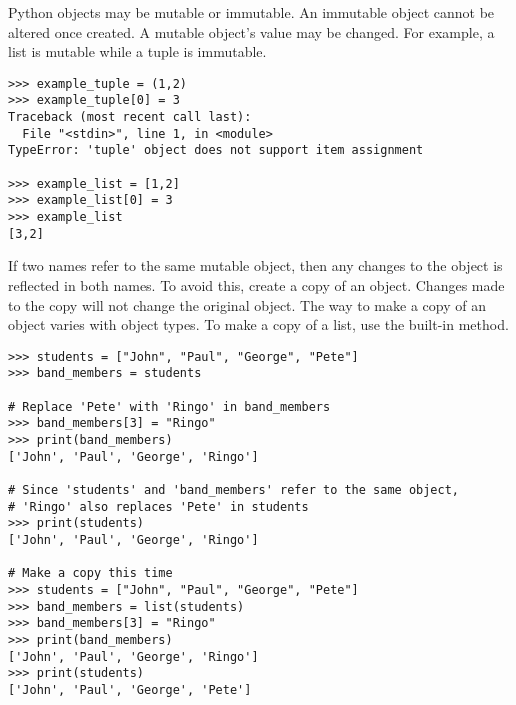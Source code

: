 Python objects may be mutable or immutable.
An immutable object cannot be altered once created.
A mutable object's value may be changed.
For example, a list is mutable while a tuple is immutable.
\begin{lstlisting}
>>> example_tuple = (1,2)
>>> example_tuple[0] = 3
Traceback (most recent call last):
  File "<stdin>", line 1, in <module>
TypeError: 'tuple' object does not support item assignment

>>> example_list = [1,2]
>>> example_list[0] = 3
>>> example_list
[3,2]
\end{lstlisting}

If two names refer to the same mutable object, then any changes to the object is reflected in both names.
To avoid this, create a copy of an object.
Changes made to the copy will not change the original object.
The way to make a copy of an object varies with object types.
To make a copy of a list, use the  built-in method.

\begin{lstlisting}
>>> students = ["John", "Paul", "George", "Pete"]
>>> band_members = students

# Replace 'Pete' with 'Ringo' in band_members
>>> band_members[3] = "Ringo"
>>> print(band_members)
['John', 'Paul', 'George', 'Ringo']

# Since 'students' and 'band_members' refer to the same object, 
# 'Ringo' also replaces 'Pete' in students
>>> print(students)
['John', 'Paul', 'George', 'Ringo']

# Make a copy this time
>>> students = ["John", "Paul", "George", "Pete"]
>>> band_members = list(students)
>>> band_members[3] = "Ringo"
>>> print(band_members)
['John', 'Paul', 'George', 'Ringo']
>>> print(students)
['John', 'Paul', 'George', 'Pete']
\end{lstlisting}

